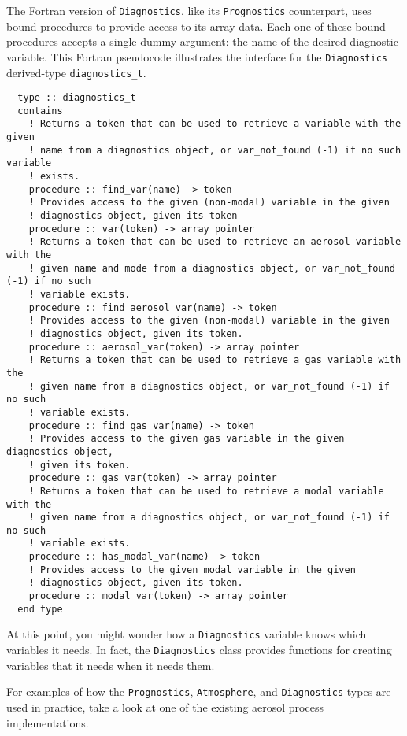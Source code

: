 The Fortran version of \texttt{Diagnostics}, like its \texttt{Prognostics} counterpart,
uses bound procedures to provide access to its array data. Each one of these
bound procedures accepts a single dummy argument: the name of the desired
diagnostic variable. This Fortran pseudocode illustrates the interface for the
\texttt{Diagnostics} derived-type \texttt{diagnostics\_t}.

\begin{lstlisting}
  type :: diagnostics_t
  contains
    ! Returns a token that can be used to retrieve a variable with the given
    ! name from a diagnostics object, or var_not_found (-1) if no such variable
    ! exists.
    procedure :: find_var(name) -> token
    ! Provides access to the given (non-modal) variable in the given
    ! diagnostics object, given its token
    procedure :: var(token) -> array pointer
    ! Returns a token that can be used to retrieve an aerosol variable with the
    ! given name and mode from a diagnostics object, or var_not_found (-1) if no such
    ! variable exists.
    procedure :: find_aerosol_var(name) -> token
    ! Provides access to the given (non-modal) variable in the given
    ! diagnostics object, given its token.
    procedure :: aerosol_var(token) -> array pointer
    ! Returns a token that can be used to retrieve a gas variable with the
    ! given name from a diagnostics object, or var_not_found (-1) if no such
    ! variable exists.
    procedure :: find_gas_var(name) -> token
    ! Provides access to the given gas variable in the given diagnostics object,
    ! given its token.
    procedure :: gas_var(token) -> array pointer
    ! Returns a token that can be used to retrieve a modal variable with the
    ! given name from a diagnostics object, or var_not_found (-1) if no such
    ! variable exists.
    procedure :: has_modal_var(name) -> token
    ! Provides access to the given modal variable in the given
    ! diagnostics object, given its token.
    procedure :: modal_var(token) -> array pointer
  end type
\end{lstlisting}

At this point, you might wonder how a \texttt{Diagnostics} variable knows which
variables it needs. In fact, the \texttt{Diagnostics} class provides functions
for creating variables that it needs when it needs them.

For examples of how the \texttt{Prognostics}, \texttt{Atmosphere}, and
\texttt{Diagnostics} types are used in practice, take a look at one of the
existing aerosol process implementations.


